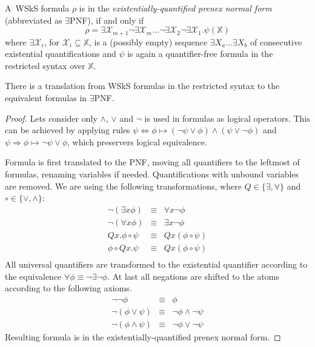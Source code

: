 	A~WSkS formula $\rho$ is in the \emph{existentially-quantified prenex normal form} (abbreviated as $\exists$PNF), if and only if $$\rho = \exists \mathcal{X}_{m+1}\neg\exists \mathcal{X}_m\ldots\neg\exists \mathcal{X}_2\neg\exists \mathcal{X}_1.\psi(\mathds{X})$$ where $\exists\mathcal{X}_i$, for $\mathcal{X}_i \subseteq \mathds{X}$, is a (possibly empty) sequence $\exists X_a\ldots\exists X_b$ of consecutive existential quantifications and $\psi$ is again a quantifier-free formula in the restricted syntax over $\mathds{X}$.
	
	\begin{prop}
	 There is a translation from WSkS formulas in the restricted syntax to the equivalent formulas in $\exists$PNF. 
	\end{prop}
	
	\begin{proof}
	 Lets consider only $\wedge$, $\vee$ and $\neg$ is used in formulas as logical operators. This can be achieved by applying rules $\psi \Leftrightarrow \phi \mapsto (\neg \psi \vee \phi) \wedge (\psi \vee \neg \phi)$ and $\psi \Rightarrow \phi \mapsto \neg \psi \vee \phi$, which preservers logical equivalence.
	
	Formula is first translated to the PNF, moving all quantifiers to the leftmost of formulas, renaming variables if needed. Quantifications with unbound variables are removed. We are using the following transformations, where $Q \in \{\exists, \forall\}$ and $\circ \in \{\vee, \wedge\}$:
	\begin{eqnarray*}
	 \neg(\exists x \phi) & \equiv & \forall x\neg \phi\\
	 \neg(\forall x \phi) & \equiv & \exists x\neg \phi\\
	 Qx.\phi \circ \psi & \equiv & Qx(\phi \circ \psi)\\
	 \phi \circ Qx.\psi & \equiv & Qx(\phi \circ \psi)\\
	\end{eqnarray*}
	All universal quantifiers are transformed to the existential quantifier according to the equivalence $\forall \phi \equiv \neg\exists\neg\phi$. At last all negations are shifted to the atoms according to the following axioms.
	\begin{eqnarray*}
	 \neg\neg\phi & \equiv & \phi\\
	 \neg(\phi\vee \psi) & \equiv & \neg \phi \wedge \neg \psi\\
	 \neg(\phi\wedge \psi) & \equiv & \neg \phi \vee \neg \psi 
	\end{eqnarray*}
 Resulting formula is in the existentially-quantified prenex normal form. 
	\end{proof}
	

